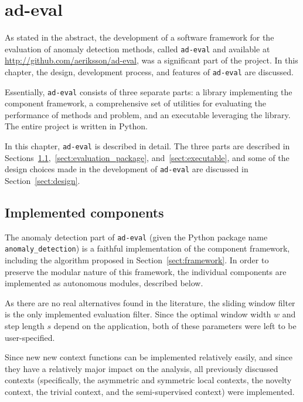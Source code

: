 \chapter{ad-eval}
\label{ch:implementation}

As stated in the abstract, the development of a software framework for the evaluation of anomaly detection methods, called \texttt{ad-eval} and available at \url{http://github.com/aeriksson/ad-eval}, was a significant part of the project. In this chapter, the design, development process, and features of \texttt{ad-eval} are discussed.

Essentially, \texttt{ad-eval} consists of three separate parts: a library implementing the component framework, a comprehensive set of utilities for evaluating the performance of methods and problem, and an executable leveraging the library. The entire project is written in Python.

In this chapter, \texttt{ad-eval} is described in detail. The three parts are described in Sections~\ref{sect:implemented_problems},~\ref{sect:evaluation_package}, and~\ref{sect:executable}, and some of the design choices made in the development of \texttt{ad-eval} are discussed in Section~\ref{sect:design}.

\section{Implemented components}
\label{sect:implemented_problems}

The anomaly detection part of \texttt{ad-eval} (given the Python package name \texttt{anomaly\_detection}) is a faithful implementation of the component framework, including the algorithm proposed in Section~\ref{sect:framework}. In order to preserve the modular nature of this framework, the individual components are implemented as autonomous modules, described below.

As there are no real alternatives found in the literature, the sliding window filter is the only implemented evaluation filter. Since the optimal window width $w$ and step length $s$ depend on the application, both of these parameters were left to be user-specified.

Since new new context functions can be implemented relatively easily, and since they have a relatively major impact on the analysis, all previously discussed contexts (specifically, the asymmetric and symmetric local contexts, the novelty context, the trivial context, and the semi-supervised context) were implemented.

